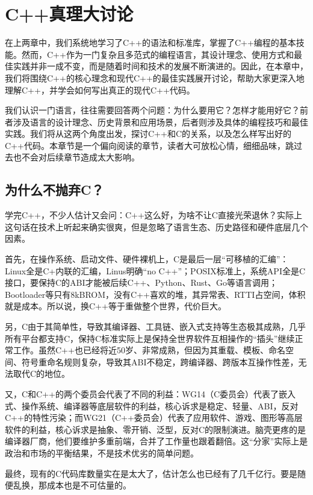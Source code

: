 \chapter{C++真理大讨论}\label{chap:cpp-3}

在上两章中，我们系统地学习了C++的语法和标准库，掌握了C++编程的基本技能。然而，C++作为一门复杂且多范式的编程语言，其设计理念、使用方式和最佳实践并非一成不变，而是随着时间和技术的发展不断演进的。因此，在本章中，我们将围绕C++的核心理念和现代C++的最佳实践展开讨论，帮助大家更深入地理解C++，并学会如何写出真正的现代C++代码。

我们认识一门语言，往往需要回答两个问题：为什么要用它？怎样才能用好它？前者涉及语言的设计理念、历史背景和应用场景，后者则涉及具体的编程技巧和最佳实践。我们将从这两个角度出发，探讨C++和C的关系，以及怎么样写出好的C++代码。本章节是一个偏向阅读的章节，读者大可放松心情，细细品味，跳过去也不会对后续章节造成太大影响。

\section{为什么不抛弃C？}

学完C++，不少人估计又会问：C++这么好，为啥不让C直接光荣退休？实际上这句话在技术上听起来确实很爽，但是忽略了语言生态、历史路径和硬件底层几个因素。

首先，在操作系统、启动文件、硬件裸机上，C是最后一层“可移植的汇编”：Linux全是C+内联的汇编，Linus明确“no C++”；POSIX标准上，系统API全是C接口，要保持C的ABI才能被后续C++、Python、Rust、Go等语言调用；Bootloader等只有8kBROM，没有C++喜欢的堆，其异常表、RTTI占空间，体积就是成本。所以说，换C++等于重做整个世界，代价巨大。

另，C由于其简单性，导致其编译器、工具链、嵌入式支持等生态极其成熟，几乎所有平台都支持C，保持C标准实际上是保持全世界软件互相操作的“插头”继续正常工作。虽然C++也已经将近50岁、非常成熟，但因为其重载、模板、命名空间、符号重命名规则复杂，导致其ABI不稳定，跨编译器、跨版本互操作性差，无法取代C的地位。

又，C和C++的两个委员会代表了不同的利益：WG14（C委员会）代表了嵌入式、操作系统、编译器等底层软件的利益，核心诉求是稳定、轻量、ABI，反对C++的特性污染；而WG21（C++委员会）代表了应用软件、游戏、图形等高层软件的利益，核心诉求是抽象、零开销、泛型，反对C的限制演进。脑壳更疼的是编译器厂商，他们要维护多重前端，合并了工作量也跟着翻倍。这“分家”实际上是政治和市场的平衡结果，不是技术优劣的简单问题。

最终，现有的C代码库数量实在是太大了，估计怎么也已经有了几千亿行。要是随便乱换，那成本也是不可估量的。

